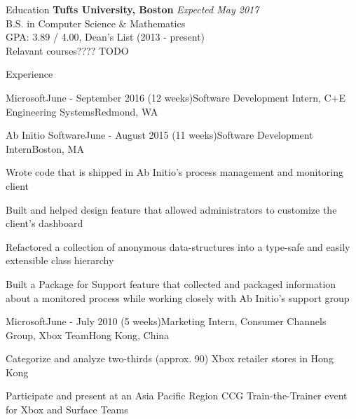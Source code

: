 \documentclass{resume}
\begin{document}
  \begin{rSection}{Education}
    {\bf Tufts University, Boston} \hfill {\em Expected May 2017} \\ 
    { B.S. in Computer Science \& Mathematics } \\
    GPA: 3.89 / 4.00, Dean's List (2013 - present)\\
    Relavant courses???? TODO
  \end{rSection}
  
  \begin{rSection}{Experience}
  
    \begin{rSubsection}{Microsoft}{June - September 2016 (12 weeks)}{Software Development Intern, C+E Engineering Systems}{Redmond, WA}
    \item 
    \end{rSubsection}
  
    \begin{rSubsection}{Ab Initio Software}{June - August 2015 (11 weeks)}{Software Development Intern}{Boston, MA}
    \item Wrote code that is shipped in Ab Initio’s process management and monitoring client
    \item Built and helped design feature that allowed administrators to customize the client’s dashboard
    \item Refactored a collection of anonymous data-structures into a type-safe and easily extensible class hierarchy
    \item Built a Package for Support feature that collected and packaged information about a monitored process while working closely with Ab Initio's support group
    \end{rSubsection}

    \begin{rSubsection}{Microsoft}{June - July 2010 (5 weeks)}{Marketing Intern, Consumer Channels Group, Xbox Team}{Hong Kong, China}
    \item Categorize and analyze two-thirds (approx. 90) Xbox retailer stores in Hong Kong
    \item Participate and present at an Asia Pacific Region CCG Train-the-Trainer event for Xbox and Surface Teams
    \end{rSubsection}
  
  \end{rSection}
\end{document}
